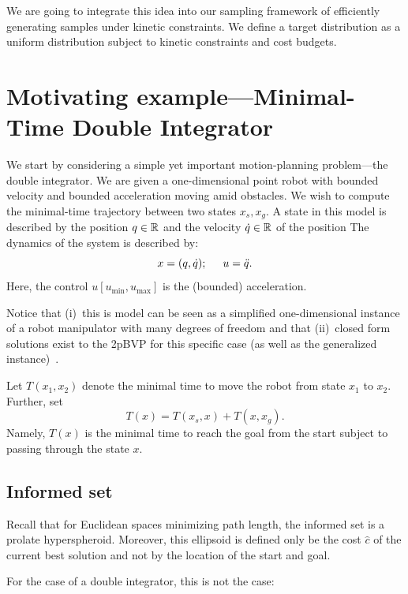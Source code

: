 \documentclass[letterpaper, 10 pt, conference]{ieeeconf}  %
\begin{document}
We are going to integrate this idea into our sampling framework of efficiently generating samples under kinetic constraints. 
We define a target distribution as a uniform distribution subject to kinetic constraints and cost budgets.

\section{Motivating example---Minimal-Time Double Integrator}
We start by considering a simple yet important motion-planning problem---the double integrator.
We are given a one-dimensional point robot  with bounded velocity and bounded acceleration moving amid obstacles. We wish to compute the minimal-time trajectory between two states $x_s, x_g$.
A state in this model is described by 
the position $q \in \mathbb{R}$
and
the velocity $\dot{q}\in \mathbb{R}$ of the position
The dynamics of the system is described by:
$$
x = (q, \dot{q}); 
\hspace{5mm}
u = \ddot{q}.
$$
Here, the control $u [u_{\text{min}}, u_{\text{max}}]$ is the (bounded) acceleration. 


Notice that 
(i)~this is model can be seen as a simplified one-dimensional instance of a robot manipulator with many degrees of freedom and that
(ii)~closed form solutions exist to the 2pBVP for this specific case (as well as the generalized instance)~\cite{HN10}.

Let $T(x_1, x_2)$ denote the minimal time to move the robot from state $x_1$ to $x_2$.
Further, set
$$
T(x) = T(x_s, x) + T(x, x_g).
$$ 
Namely, $T(x)$ is the minimal time to reach the goal from the start subject to passing through the state $x$.

\subsection{Informed set}
Recall that for Euclidean spaces minimizing path length, the informed set is a prolate hyperspheroid.
Moreover, this ellipsoid is defined only be the cost $\hat{c}$ of the current best solution and not by the location of the start and goal.

For the case of a double integrator, this is not the case:
\end{document}
